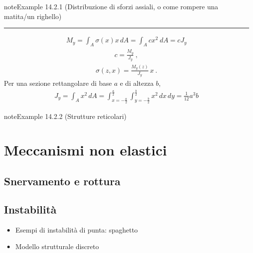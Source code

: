 \documentclass[letterpaper,10pt,italian]{jupyterBook}
\begin{document}
\begin{sphinxadmonition}{note}{Example 14.2.1 (Distribuzione di sforzi assiali, o come rompere una matita/un righello)}
\bigskip\hrule\bigskip

\begin{equation*}
\begin{split}M_y = \int_A \sigma(x) x \, dA = \int_A c x^2 \ dA = c J_y\end{split}
\end{equation*}\begin{equation*}
\begin{split}c = \frac{M_y}{J_y} \ ,\end{split}
\end{equation*}\begin{equation*}
\begin{split}\sigma(z,x) = \frac{M_y(z)}{J_y} \, x \ .\end{split}
\end{equation*}
\sphinxAtStartPar
Per una sezione rettangolare di base \(a\) e di altezza \(b\),
\begin{equation*}
\begin{split}J_y = \int_A x^2 \, dA = \int_{x=-\frac{a}{2}}^{\frac{a}{2}} \int_{y=-\frac{b}{2}}^{\frac{b}{2}} x^2 \, dx \, dy = \frac{1}{12} a^3 b \end{split}
\end{equation*}
\sphinxAtStartPar
{}
\end{sphinxadmonition}
\label{ch/continuum/solids:solids-frame}
\begin{sphinxadmonition}{note}{Example 14.2.2 (Strutture reticolari)}


\end{sphinxadmonition}


\section{Meccanismi non elastici}
\label{\detokenize{ch/continuum/solids:meccanismi-non-elastici}}\label{\detokenize{ch/continuum/solids:continuum-solids-non-elastic}}

\subsection{Snervamento e rottura}
\label{\detokenize{ch/continuum/solids:snervamento-e-rottura}}\label{\detokenize{ch/continuum/solids:continuum-solids-plastic}}

\subsection{Instabilità}
\label{\detokenize{ch/continuum/solids:instabilita}}\label{\detokenize{ch/continuum/solids:continuum-solids-instability}}\begin{itemize}
\item {} 
\sphinxAtStartPar
Esempi di instabilità di punta: spaghetto

\item {} 
\sphinxAtStartPar
Modello strutturale discreto

\end{itemize}
\end{document}
